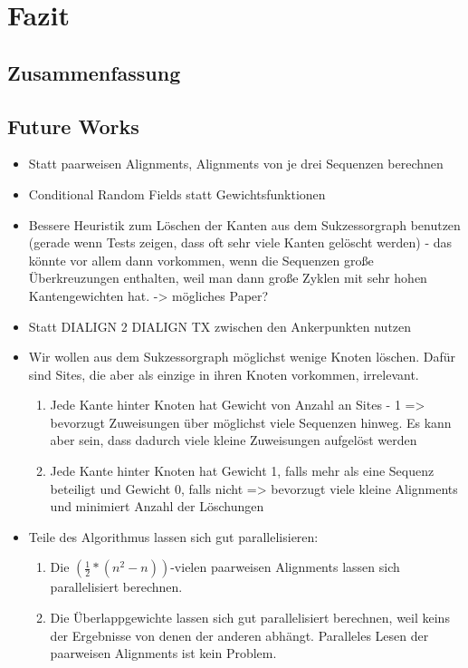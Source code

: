 \chapter{Fazit}
\label{ch:fazit}

\section{Zusammenfassung}

\section{Future Works}

\begin{itemize}
	\item Statt paarweisen Alignments, Alignments von je drei Sequenzen berechnen
	\item Conditional Random Fields statt Gewichtsfunktionen
	\item Bessere Heuristik zum Löschen der Kanten aus dem Sukzessorgraph benutzen (gerade wenn Tests zeigen, dass oft sehr viele Kanten gelöscht werden) - das könnte vor allem dann vorkommen, wenn die Sequenzen große Überkreuzungen enthalten, weil man dann große Zyklen mit sehr hohen Kantengewichten hat. -> mögliches Paper?
	\item Statt DIALIGN 2 DIALIGN TX zwischen den Ankerpunkten nutzen
	\item Wir wollen aus dem Sukzessorgraph möglichst wenige Knoten löschen. Dafür sind Sites, die aber als einzige in ihren Knoten vorkommen, irrelevant. 
		\begin{enumerate}
			\item Jede Kante hinter Knoten hat Gewicht von Anzahl an Sites - 1 => bevorzugt Zuweisungen über möglichst viele Sequenzen hinweg. Es kann aber sein, dass dadurch viele kleine Zuweisungen aufgelöst werden
			\item Jede Kante hinter Knoten hat Gewicht 1, falls mehr als eine Sequenz beteiligt und Gewicht 0, falls nicht => bevorzugt viele kleine Alignments und minimiert Anzahl der Löschungen
		\end{enumerate}
	\item Teile des Algorithmus lassen sich gut parallelisieren:
		\begin{enumerate}
			\item Die $(\frac{1}{2}*(n^2-n))$-vielen paarweisen Alignments lassen sich parallelisiert berechnen.
			\item Die Überlappgewichte lassen sich gut parallelisiert berechnen, weil keins der Ergebnisse von denen der anderen abhängt. Paralleles Lesen der paarweisen Alignments ist kein Problem.

\end{enumerate}
\end{itemize}
